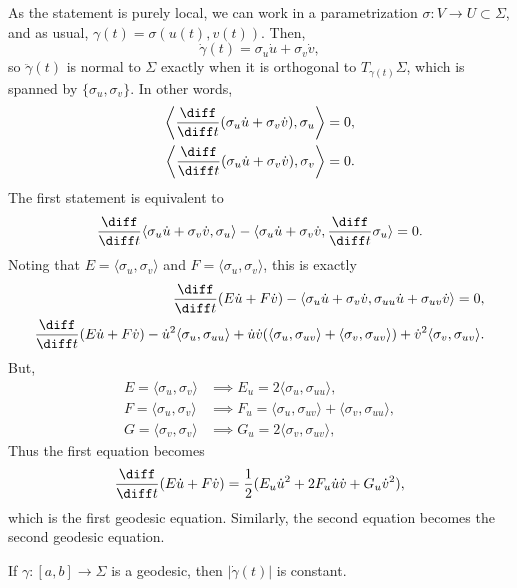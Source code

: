 \documentclass[12pt]{article}
\begin{document}
\begin{proofbox}
	As the statement is purely local, we can work in a parametrization $\sigma : V \to U \subset \Sigma$, and as usual, $\gamma(t) = \sigma(u(t), v(t))$. Then,
	\[
	\dot \gamma(t) = \sigma_u \dot u + \sigma_v \dot v,
	\]
	so $\ddot \gamma(t)$ is normal to $\Sigma$ exactly when it is orthogonal to $T_{\gamma(t)}\Sigma$, which is spanned by $\{\sigma_u, \sigma_v\}$. In other words,
	\begin{align*}
		\biggl\langle \frac{\diff}{\diff t} (\sigma_u \dot u + \sigma_v \dot v), \sigma_u \biggr\rangle &= 0, \\
		\biggl\langle \frac{\diff}{\diff t} (\sigma_u \dot u + \sigma_v \dot v), \sigma_v \biggr\rangle &= 0.
	\end{align*}
	The first statement is equivalent to
	\[
	\frac{\diff}{\diff t}\langle \sigma_u \dot u + \sigma_v \dot v, \sigma_u \rangle - \langle \sigma_u \dot u + \sigma_v \dot v, \frac{\diff}{\diff t} \sigma_u \rangle = 0.
	\]
	Noting that $E = \langle \sigma_u, \sigma_v \rangle$ and $F = \langle \sigma_u, \sigma_v\rangle$, this is exactly
	\begin{align*}
		\frac{\diff}{\diff t} (E \dot u + F \dot v) - \langle \sigma_u \dot u + \sigma_v \dot v, \sigma_{uu} \dot u + \sigma_{uv} \dot v \rangle = 0, \\
		\frac{\diff}{\diff t}(E \dot u + F \dot v) - \dot u^2 \langle \sigma_u, \sigma_{uu} \rangle + \dot u \dot v (\langle \sigma_u, \sigma_{uv}\rangle + \langle \sigma_v, \sigma_{uv} \rangle) + \dot v^2 \langle\sigma_v, \sigma_{uv}\rangle.
	\end{align*}
	But,
	\begin{align*}
		E = \langle\sigma_u, \sigma_v\rangle &\implies E_u = 2 \langle\sigma_u, \sigma_{uu}\rangle, \\
		F = \langle\sigma_u, \sigma_v \rangle &\implies F_u = \langle\sigma_u, \sigma_{uv}\rangle + \langle\sigma_v, \sigma_{uu}\rangle, \\
		G = \langle\sigma_v, \sigma_v\rangle &\implies G_u = 2 \langle\sigma_v, \sigma_{uv}\rangle,
	\end{align*}
	Thus the first equation becomes
	\[
	\frac{\diff}{\diff t}(E \dot u + F \dot v) = \frac{1}{2} (E_u \dot u^2 + 2 F_u \dot u \dot v + G_u \dot v^2),
	\]
	which is the first geodesic equation. Similarly, the second equation becomes the second geodesic equation.
\end{proofbox}

\begin{corollary}
	If $\gamma : [a, b] \to \Sigma$ is a geodesic, then $|\dot \gamma(t)|$ is constant.
\end{corollary}
\end{document}
